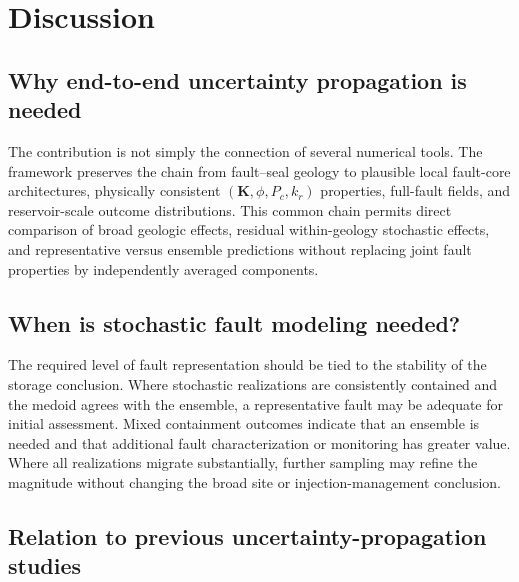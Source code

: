 
\section{Discussion}


\subsection{Why end-to-end uncertainty propagation is needed}

The contribution is not simply the connection of several numerical tools.
The framework preserves the chain from fault--seal geology to plausible local
fault-core architectures, physically consistent
$(\mathbf{K},\phi,P_c,k_r)$ properties, full-fault fields, and
reservoir-scale outcome distributions. This common chain permits direct
comparison of broad geologic effects, residual within-geology stochastic
effects, and representative versus ensemble predictions without replacing
joint fault properties by independently averaged components.

\subsection{When is stochastic fault modeling needed?}

The required level of fault representation should be tied to the stability of
the storage conclusion. Where stochastic realizations are consistently
contained and the medoid agrees with the ensemble, a representative fault may
be adequate for initial assessment. Mixed containment outcomes indicate that
an ensemble is needed and that additional fault characterization or monitoring
has greater value. Where all realizations migrate substantially, further
sampling may refine the magnitude without changing the broad site or
injection-management conclusion. 

\subsection{Relation to previous uncertainty-propagation studies}

